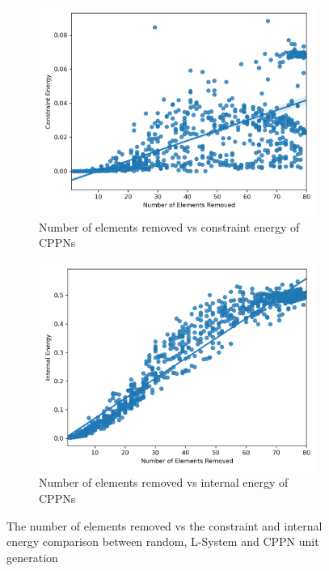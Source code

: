 \begin{figure}[H]
\begin{subfigure}[t]{0.45\textwidth}
		\includegraphics[width=\textwidth]{ne_ce_cppn.png}
		\caption{Number of elements removed vs constraint energy of CPPNs}
	\end{subfigure}
	\hfill
	\begin{subfigure}[t]{0.45\textwidth}
		\centering
		\includegraphics[width=\textwidth]{ne_ie_cppn.png}
		\caption{Number of elements removed vs internal energy of CPPNs}
	\end{subfigure}
	\caption[Number of elements removed vs system energy comparison]{The number of elements removed vs the constraint and internal energy comparison between random, L-System and CPPN unit generation}
	\label{fig:neecomp}
\end{figure}

